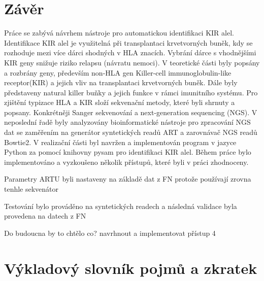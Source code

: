 \documentclass[czech,DP]{thesiskiv}
\numberwithin{equation}{section}
\begin{document}
\chapter{Závěr}
Práce se zabývá návrhem nástroje pro automatickou identifikaci KIR alel. Identifikace KIR alel je využitelná při transplantaci krvetvorných buněk, kdy se rozhoduje mezi více dárci shodných v HLA znacích. Vybrání dárce s vhodnějšími KIR geny snižuje riziko relapsu (návratu nemoci). V teoretické části byly popsány a rozbrány geny, především non-HLA gen Killer-cell immunoglobulin-like receptor(KIR) a jejich vliv na transplantaci krvetvorných buněk. Dále byly představeny natural killer buňky a jejich funkce v rámci imunitního systému. Pro zjištění typizace HLA a KIR složí sekvenační metody, které byli shrnuty a popsany. Konkrétněji Sanger sekvenování a next-generation sequencing (NGS). V neposlední řadě byly analyzovány bioinformatické nástroje pro zpracování NGS dat se zaměřením na generátor syntetických readů ART a zarovnávač NGS readů Bowtie2.
V realizační části byl navržen a implementován program v jazyce Python za pomocí knihovny pysam pro identifikaci KIR alel. Během práce bylo implementováno a vyzkoušeno několik přístupů, které byli v práci zhodnoceny. 

Parametry ARTU byli nastaveny na základě dat z FN protože používají zrovna tenhle sekvenátor

Testování bylo prováděno na syntetických readech a následná validace byla provedena na datech z FN

Do budoucna by to chtělo co?
navrhnout a implementovat přístup 4

\chapter{Výkladový slovník pojmů a zkratek}
\end{document}
